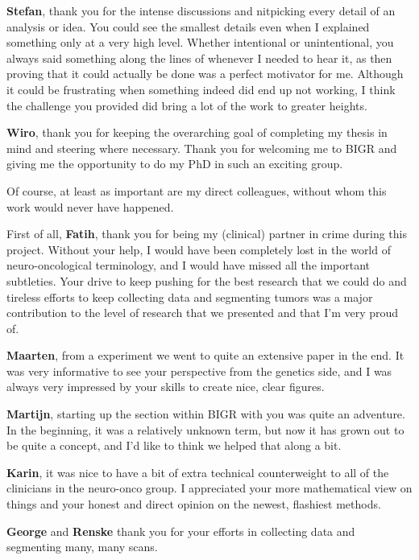 \textbf{Stefan}, thank you for the intense discussions and nitpicking every detail of an analysis or idea. You could see the smallest details even when I explained something only at a very high level.
Whether intentional or unintentional, you always said something along the lines of  whenever I needed to hear it, as then proving that it could actually be done was a perfect motivator for me.
Although it could be frustrating when something indeed did end up not working, I think the challenge you provided did bring a lot of the work to greater heights.

\textbf{Wiro}, thank you for keeping the overarching goal of completing my thesis in mind and steering where necessary.
Thank you for welcoming me to BIGR and giving me the opportunity to do my PhD in such an exciting group.

Of course, at least as important are my direct colleagues, without whom this work would never have happened.

First of all, \textbf{Fatih}, thank you for being my (clinical) partner in crime during this project.
Without your help, I would have been completely lost in the world of neuro-oncological terminology, and I would have missed all the important subtleties.
Your drive to keep pushing for the best research that we could do and tireless efforts to keep collecting data and segmenting tumors was a major contribution to the level of research that we presented and that I'm very proud of.

\textbf{Maarten}, from a  experiment we went to quite an extensive paper in the end.
It was very informative to see your perspective from the genetics side, and I was always very impressed by your skills to create nice, clear figures.

\textbf{Martijn}, starting up the  section within BIGR with you was quite an adventure.
In the beginning, it was a relatively unknown term, but now it has grown out to be quite a concept, and I'd like to think we helped that along a bit.

\textbf{Karin}, it was nice to have a bit of extra technical counterweight to all of the clinicians in the neuro-onco group.
I appreciated your more mathematical view on things and your honest and direct opinion on the newest, flashiest methods.

\textbf{George} and \textbf{Renske} thank you for your efforts in collecting data and segmenting many, many scans.

